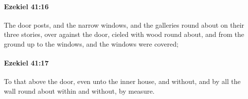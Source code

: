 		\paragraph{Ezekiel 41:16} %
			\label{EZEKIEL-41-16}

			The door posts, and the narrow windows, and the galleries round about on their three stories, over against the door, cieled with wood round about, and from the ground up to the windows, and the windows were covered;


		\paragraph{Ezekiel 41:17} %
			\label{EZEKIEL-41-17}

			To that above the door, even unto the inner house, and without, and by all the wall round about within and without, by measure.


